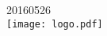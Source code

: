 \begin{center}

{\Large 
2016\hspace{1pt}\raisebox{1pt}{-}05\hspace{1pt}\raisebox{1pt}{-}26%
}\\[1.5cm] 


\texttt{[image: logo.pdf]} %
 

\vfill %
\end{center}
\restoregeometry





